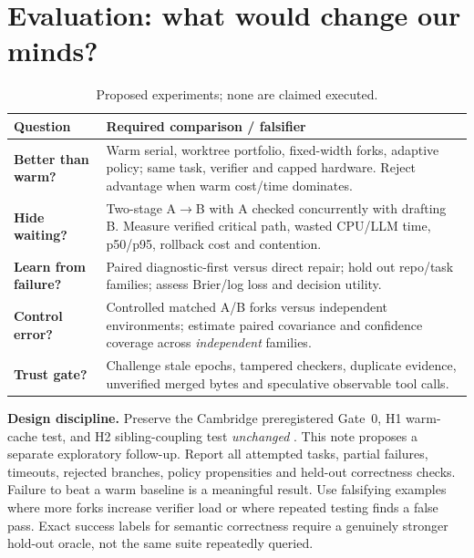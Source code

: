 \documentclass[10pt,twocolumn]{article}
\newcommand{\head}[1]{\textbf{\color{ink}#1}}
\begin{document}
\section{Evaluation: what would change our minds?}

\begin{table}[H]\centering\footnotesize
\begin{tabularx}{\columnwidth}{@{}p{}X@{}}\toprule
Question & Required comparison / falsifier \\\midrule
\textbf{Better than warm?} & Warm serial, worktree portfolio, fixed-width forks, adaptive policy; same task, verifier and capped hardware. Reject advantage when warm cost/time dominates.\\
\textbf{Hide waiting?} & Two-stage A$\to$B with A checked concurrently with drafting B. Measure verified critical path, wasted CPU/LLM time, p50/p95, rollback cost and contention.\\
\textbf{Learn from failure?} & Paired diagnostic-first versus direct repair; hold out repo/task families; assess Brier/log loss and decision utility.\\
\textbf{Control error?} & Controlled matched A/B forks versus independent environments; estimate paired covariance and confidence coverage across \emph{independent} families.\\
\textbf{Trust gate?} & Challenge stale epochs, tampered checkers, duplicate evidence, unverified merged bytes and speculative observable tool calls.\\\bottomrule
\end{tabularx}\caption{Proposed experiments; none are claimed executed.}
\end{table}

\head{Design discipline.} Preserve the Cambridge preregistered Gate~0, H1 warm-cache test, and H2 sibling-coupling test \emph{unchanged} \cite{cam}. This note proposes a separate exploratory follow-up. Report all attempted tasks, partial failures, timeouts, rejected branches, policy propensities and held-out correctness checks. Failure to beat a warm baseline is a meaningful result. Use falsifying examples where more forks increase verifier load or where repeated testing finds a false pass. Exact success labels for semantic correctness require a genuinely stronger hold-out oracle, not the same suite repeatedly queried.
\end{document}
